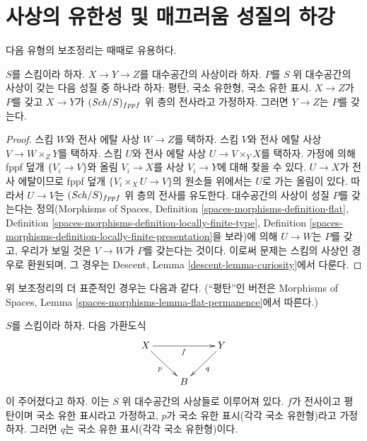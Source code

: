 \section{사상의 유한성 및 매끄러움 성질의 하강}
\label{section-descent-finiteness-morphisms}

\noindent
다음 유형의 보조정리는 때때로 유용하다.

\begin{lemma}
\label{lemma-curiosity}
$S$를 스킴이라 하자. $X\to Y\to Z$를 대수공간의 사상이라 하자.
$P$를 $S$ 위 대수공간의 사상이 갖는 다음 성질 중 하나라 하자:
평탄, 국소 유한형, 국소 유한 표시. $X\to Z$가 $P$를 갖고
$X\to Y$가 $(\mathit{Sch}/S)_{fppf}$ 위 층의 전사라고 가정하자. 그러면
$Y\to Z$는 $P$를 갖는다.
\end{lemma}

\begin{proof}
스킴 $W$와 전사 에탈 사상 $W\to Z$를 택하자. 스킴 $V$와 전사 에탈
사상 $V\to W\times_ZY$를 택하자. 스킴 $U$와 전사 에탈 사상
$U\to V\times_YX$를 택하자. 가정에 의해 fppf 덮개
$\{V_i\to V\}$와 올림 $V_i\to X$를 사상 $V_i\to Y$에 대해 찾을 수 있다.
$U\to X$가 전사 에탈이므로 fppf 덮개
$\{V_i\times_XU\to V\}$의 원소들 위에서는 $U$로 가는 올림이 있다.
따라서 $U\to V$는 $(\mathit{Sch}/S)_{fppf}$ 위 층의 전사를 유도한다.
대수공간의 사상이 성질 $P$를 갖는다는 정의(Morphisms of Spaces,
Definition \ref{spaces-morphisms-definition-flat}, Definition
\ref{spaces-morphisms-definition-locally-finite-type}, Definition
\ref{spaces-morphisms-definition-locally-finite-presentation}을 보라)에 의해
$U\to W$는 $P$를 갖고, 우리가 보일 것은 $V\to W$가 $P$를 갖는다는
것이다. 이로써 문제는 스킴의 사상인 경우로 환원되며, 그 경우는 Descent,
Lemma \ref{descent-lemma-curiosity}에서 다룬다.
\end{proof}

\noindent
위 보조정리의 더 표준적인 경우는 다음과 같다. (``평탄''인 버전은
Morphisms of Spaces, Lemma
\ref{spaces-morphisms-lemma-flat-permanence}에서 따른다.)

\begin{lemma}
\label{lemma-flat-finitely-presented-permanence}
$S$를 스킴이라 하자. 다음 가환도식
$$
\xymatrix{
X \ar[rr]_f \ar[rd]_p & &
Y \ar[dl]^q \\
& B
}
$$
이 주어졌다고 하자. 이는 $S$ 위 대수공간의 사상들로 이루어져 있다.
$f$가 전사이고 평탄이며 국소 유한 표시라고
가정하고, $p$가 국소 유한 표시(각각 국소 유한형)라고 가정하자. 그러면
$q$는 국소 유한 표시(각각 국소 유한형)이다.
\end{lemma}

